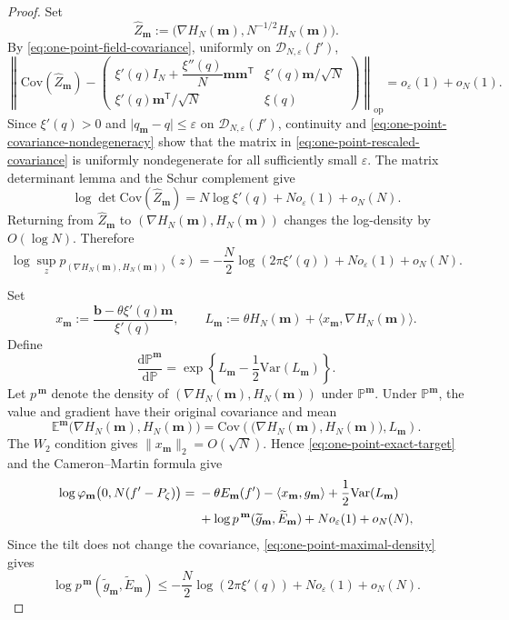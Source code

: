 \documentclass[a4paper,10pt,reqno]{amsart}
\numberwithin{equation}{section}
\newcommand{\ve}{\varepsilon}
\newcommand{\dE}{\mathbb{E}}%
\newcommand{\Var}{\mathrm{Var}}%
\newcommand{\Cov}{\mathrm{Cov} }%
\newcommand{\dd}{\mathrm{d}}
\newcommand{\bfm}{\mathbf{m}}
\newcommand{\bfb}{\mathbf{b}}
\begin{document}
\begin{proof}
		Set
		\[
		\widehat Z_\bfm
		:=
		\bigl(\nabla H_N(\bfm),N^{-1/2}H_N(\bfm)\bigr).
		\]
		By \eqref{eq:one-point-field-covariance}, uniformly on
		\(\mathcal D_{N,\ve}(f')\),
		\begin{equation}\label{eq:one-point-rescaled-covariance}
			\left\|
			\Cov(\widehat Z_\bfm)
			-
			\begin{pmatrix}
				\xi'(q)I_N+\dfrac{\xi''(q)}N\bfm\bfm^{\mathsf T}
				&\xi'(q)\bfm/\sqrt N\\[4pt]
				\xi'(q)\bfm^{\mathsf T}/\sqrt N
				&\xi(q)
			\end{pmatrix}
			\right\|_{\mathrm{op}}
			=o_\ve(1)+o_N(1).
		\end{equation}
		Since \(\xi'(q)>0\) and
		\(\lvert q_\bfm-q\rvert\le\ve\) on
		\(\mathcal D_{N,\ve}(f')\), continuity and
		\eqref{eq:one-point-covariance-nondegeneracy} show that the matrix
		in \eqref{eq:one-point-rescaled-covariance} is uniformly
		nondegenerate for all sufficiently small \(\ve\). The matrix
		determinant lemma and the Schur complement give
		\[
		\log\det\Cov(\widehat Z_\bfm)
		=
		N\log\xi'(q)+N o_\ve(1)+o_N(N).
		\]
		Returning from \(\widehat Z_\bfm\) to
		\((\nabla H_N(\bfm),H_N(\bfm))\) changes the log-density by
		\(O(\log N)\). Therefore
		\begin{equation}\label{eq:one-point-maximal-density}
			\log\sup_z p_{(\nabla H_N(\bfm),H_N(\bfm))}(z)
			=
			-\frac N2\log(2\pi\xi'(q))
			+N o_\ve(1)+o_N(N).
		\end{equation}
		
		Set
		\[
		x_\bfm
		:=
		\frac{\bfb-\theta\xi'(q)\bfm}{\xi'(q)},
		\qquad
		L_\bfm
		:=
		\theta H_N(\bfm)
		+\langle x_\bfm,\nabla H_N(\bfm)\rangle.
		\]
		Define
		\[
		\frac{\dd\mathbb P^\bfm}{\dd\mathbb P}
		=
		\exp\left\{
		L_\bfm-\frac12\Var(L_\bfm)
		\right\}.
		\]
		Let \(p^{\,\bfm}\) denote the density of
		\((\nabla H_N(\bfm),H_N(\bfm))\) under \(\mathbb P^\bfm\).
		Under \(\mathbb P^\bfm\), the value and gradient have their original
		covariance and mean
		\[
		\dE^\bfm
		\bigl(\nabla H_N(\bfm),H_N(\bfm)\bigr)
		=
		\Cov\left(
		\bigl(\nabla H_N(\bfm),H_N(\bfm)\bigr),L_\bfm
		\right).
		\]
		The \(W_2\) condition gives
		\(\|x_\bfm\|_2=O(\sqrt N)\). Hence
		\eqref{eq:one-point-exact-target} and the Cameron--Martin formula give
		\begin{align}
			\log \varphi_\bfm\bigl(0,N(f'-P_\zeta)\bigr)
			={}&
			-\theta E_\bfm(f')
			-\langle x_\bfm,g_\bfm\rangle
			+\frac12\Var(L_\bfm)\notag\\
			&+
			\log p^{\,\bfm}
			(\widetilde g_\bfm,\widetilde E_\bfm)
			+N o_\ve(1)+o_N(N),
			\label{eq:one-point-CM-density}
		\end{align}
		Since the tilt does not change the covariance,
		\eqref{eq:one-point-maximal-density} gives
		\[
		\log p^{\,\bfm}
		(\widetilde g_\bfm,\widetilde E_\bfm)
		\le
		-\frac N2\log(2\pi\xi'(q))
		+N o_\ve(1)+o_N(N).
		\]
		

\end{proof}
\end{document}
